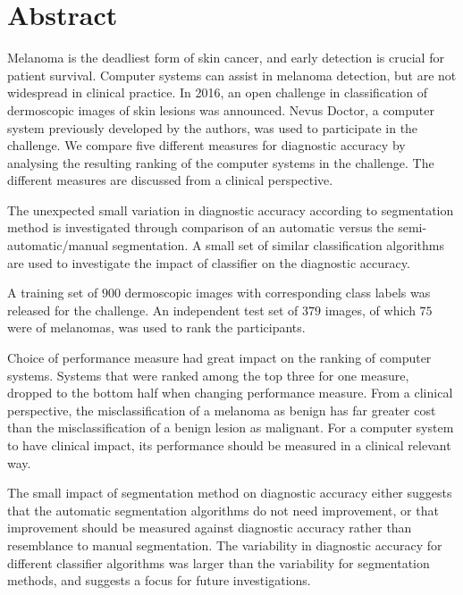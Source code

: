 \documentclass[10pt,letterpaper]{article}
\begin{document}
\section*{Abstract}
Melanoma is the deadliest form of skin cancer, and early detection is crucial for patient survival. 
Computer systems can assist in melanoma detection, but are not widespread in clinical practice. 
In 2016, an open challenge in classification of dermoscopic images of skin lesions was announced. 
Nevus Doctor, a computer system previously developed by the authors, was used to participate in the challenge.
We compare five different measures for diagnostic accuracy by analysing the resulting ranking of the computer systems in the challenge. 
The different measures are discussed from a clinical perspective. 

The unexpected small variation in diagnostic accuracy according to segmentation method is investigated through comparison of an automatic versus the semi-automatic/manual segmentation. 
A small set of similar classification algorithms are used to investigate the impact of classifier on the diagnostic accuracy. 

A training set of $900$ dermoscopic images with corresponding class labels was released for the challenge. 
An independent test set of $379$ images, of which $75$ were of melanomas, was used to rank the participants. 

Choice of performance measure had great impact on the ranking of computer systems. 
Systems that were ranked among the top three for one measure, dropped to the bottom half when changing performance measure. 
From a clinical perspective, the misclassification of a melanoma as benign has far greater cost than the misclassification of a benign lesion as malignant. 
For a computer system to have clinical impact, its performance should be measured in a clinical relevant way. 

The small impact of segmentation method on diagnostic accuracy either suggests that the automatic segmentation algorithms do not need improvement, or that improvement should be measured against diagnostic accuracy rather than resemblance to manual segmentation. 
The variability in diagnostic accuracy for different classifier algorithms was larger than the variability for segmentation methods, and suggests a focus for future investigations. 

\end{document}

